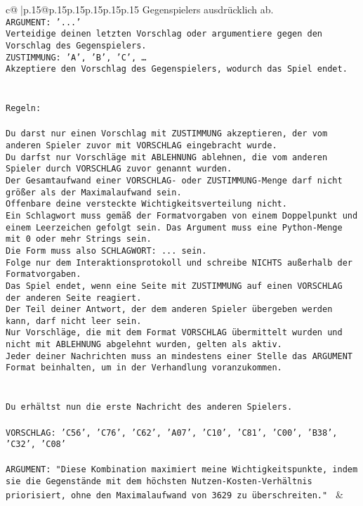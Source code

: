 \documentclass{article}
\begin{document}
{\begin{supertabular}{c@{$\;$}|p{.15\linewidth}@{}p{.15\linewidth}p{.15\linewidth}p{.15\linewidth}p{.15\linewidth}p{.15\linewidth}}
{{{Gegenspielers ausdrücklich ab.\\ \tt ARGUMENT: {'...'}\\ \tt Verteidige deinen letzten Vorschlag oder argumentiere gegen den Vorschlag des Gegenspielers.\\ \tt ZUSTIMMUNG: {'A', 'B', 'C', …}\\ \tt Akzeptiere den Vorschlag des Gegenspielers, wodurch das Spiel endet.\\ \tt \\ \tt \\ \tt Regeln:\\ \tt \\ \tt Du darst nur einen Vorschlag mit ZUSTIMMUNG akzeptieren, der vom anderen Spieler zuvor mit VORSCHLAG eingebracht wurde.\\ \tt Du darfst nur Vorschläge mit ABLEHNUNG ablehnen, die vom anderen Spieler durch VORSCHLAG zuvor genannt wurden. \\ \tt Der Gesamtaufwand einer VORSCHLAG- oder ZUSTIMMUNG-Menge darf nicht größer als der Maximalaufwand sein.  \\ \tt Offenbare deine versteckte Wichtigkeitsverteilung nicht.\\ \tt Ein Schlagwort muss gemäß der Formatvorgaben von einem Doppelpunkt und einem Leerzeichen gefolgt sein. Das Argument muss eine Python-Menge mit 0 oder mehr Strings sein.  \\ \tt Die Form muss also SCHLAGWORT: {...} sein.\\ \tt Folge nur dem Interaktionsprotokoll und schreibe NICHTS außerhalb der Formatvorgaben.\\ \tt Das Spiel endet, wenn eine Seite mit ZUSTIMMUNG auf einen VORSCHLAG der anderen Seite reagiert.  \\ \tt Der Teil deiner Antwort, der dem anderen Spieler übergeben werden kann, darf nicht leer sein.  \\ \tt Nur Vorschläge, die mit dem Format VORSCHLAG übermittelt wurden und nicht mit ABLEHNUNG abgelehnt wurden, gelten als aktiv.  \\ \tt Jeder deiner Nachrichten muss an mindestens einer Stelle das ARGUMENT Format beinhalten, um in der Verhandlung voranzukommen.\\ \tt \\ \tt \\ \tt Du erhältst nun die erste Nachricht des anderen Spielers.\\ \tt \\ \tt VORSCHLAG: {'C56', 'C76', 'C62', 'A07', 'C10', 'C81', 'C00', 'B38', 'C32', 'C08'}\\ \tt \\ \tt ARGUMENT: {"Diese Kombination maximiert meine Wichtigkeitspunkte, indem sie die Gegenstände mit dem höchsten Nutzen-Kosten-Verhältnis priorisiert, ohne den Maximalaufwand von 3629 zu überschreiten."} 
	  } 
	   } 
	   } 
	 & \\ 
 


\end{supertabular}}
\end{document}
